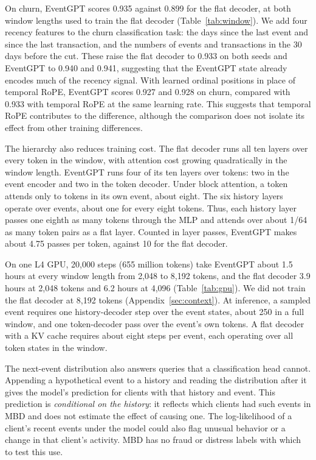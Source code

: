 \documentclass[12pt]{article}
\begin{document}
On churn, EventGPT scores 0.935 against 0.899 for the flat decoder, at both window lengths used to train the flat decoder (Table~\ref{tab:window}). We add four recency features to the churn classification task: the days since the last event and since the last transaction, and the numbers of events and transactions in the 30 days before the cut. These raise the flat decoder to 0.933 on both seeds and EventGPT to 0.940 and 0.941, suggesting that the EventGPT state already encodes much of the recency signal. With learned ordinal positions in place of temporal RoPE, EventGPT scores 0.927 and 0.928 on churn, compared with 0.933 with temporal RoPE at the same learning rate. This suggests that temporal RoPE contributes to the difference, although the comparison does not isolate its effect from other training differences.

The hierarchy also reduces training cost. The flat decoder runs all ten layers over every token in the window, with attention cost growing quadratically in the window length. EventGPT runs four of its ten layers over tokens: two in the event encoder and two in the token decoder. Under block attention, a token attends only to tokens in its own event, about eight. The six history layers operate over events, about one for every eight tokens. Thus, each history layer passes one eighth as many tokens through the MLP and attends over about 1/64 as many token pairs as a flat layer. Counted in layer passes, EventGPT makes about 4.75 passes per token, against 10 for the flat decoder.

On one L4 GPU, 20,000 steps (655 million tokens) take EventGPT about 1.5 hours at every window length from 2,048 to 8,192 tokens, and the flat decoder 3.9 hours at 2,048 tokens and 6.2 hours at 4,096 (Table~\ref{tab:gpu}). We did not train the flat decoder at 8,192 tokens (Appendix~\ref{sec:context}). At inference, a sampled event requires one history-decoder step over the event states, about 250 in a full window, and one token-decoder pass over the event's own tokens. A flat decoder with a KV cache requires about eight steps per event, each operating over all token states in the window.

The next-event distribution also answers queries that a classification head cannot. Appending a hypothetical event to a history and reading the distribution after it gives the model's prediction for clients with that history and event. This prediction is \emph{conditional on the history}: it reflects which clients had such events in MBD and does not estimate the effect of causing one. The log-likelihood of a client's recent events under the model could also flag unusual behavior or a change in that client's activity. MBD has no fraud or distress labels with which to test this use.
\end{document}
